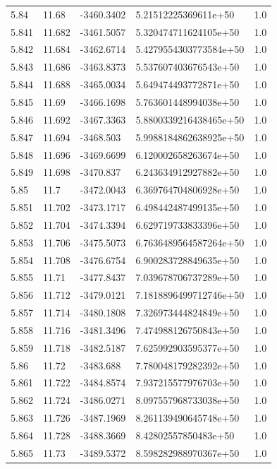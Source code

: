 \begin{tabular}{lllll}
5.84 & 11.68 & -3460.3402 & 5.21512225369611e+50 & 1.0 \\
5.841 & 11.682 & -3461.5057 & 5.320474711624105e+50 & 1.0 \\
5.842 & 11.684 & -3462.6714 & 5.4279554303773584e+50 & 1.0 \\
5.843 & 11.686 & -3463.8373 & 5.537607403676543e+50 & 1.0 \\
5.844 & 11.688 & -3465.0034 & 5.649474493772871e+50 & 1.0 \\
5.845 & 11.69 & -3466.1698 & 5.763601448994038e+50 & 1.0 \\
5.846 & 11.692 & -3467.3363 & 5.8800339216438465e+50 & 1.0 \\
5.847 & 11.694 & -3468.503 & 5.9988184862638925e+50 & 1.0 \\
5.848 & 11.696 & -3469.6699 & 6.120002658263674e+50 & 1.0 \\
5.849 & 11.698 & -3470.837 & 6.243634912927882e+50 & 1.0 \\
5.85 & 11.7 & -3472.0043 & 6.369764704806928e+50 & 1.0 \\
5.851 & 11.702 & -3473.1717 & 6.498442487499135e+50 & 1.0 \\
5.852 & 11.704 & -3474.3394 & 6.629719733833396e+50 & 1.0 \\
5.853 & 11.706 & -3475.5073 & 6.7636489564587264e+50 & 1.0 \\
5.854 & 11.708 & -3476.6754 & 6.900283728849635e+50 & 1.0 \\
5.855 & 11.71 & -3477.8437 & 7.039678706737289e+50 & 1.0 \\
5.856 & 11.712 & -3479.0121 & 7.1818896499712746e+50 & 1.0 \\
5.857 & 11.714 & -3480.1808 & 7.326973444824849e+50 & 1.0 \\
5.858 & 11.716 & -3481.3496 & 7.474988126750843e+50 & 1.0 \\
5.859 & 11.718 & -3482.5187 & 7.625992903595377e+50 & 1.0 \\
5.86 & 11.72 & -3483.688 & 7.780048179282392e+50 & 1.0 \\
5.861 & 11.722 & -3484.8574 & 7.937215577976703e+50 & 1.0 \\
5.862 & 11.724 & -3486.0271 & 8.097557968733038e+50 & 1.0 \\
5.863 & 11.726 & -3487.1969 & 8.261139490645748e+50 & 1.0 \\
5.864 & 11.728 & -3488.3669 & 8.42802557850483e+50 & 1.0 \\
5.865 & 11.73 & -3489.5372 & 8.598282988970367e+50 & 1.0 \\

\end{tabular}
